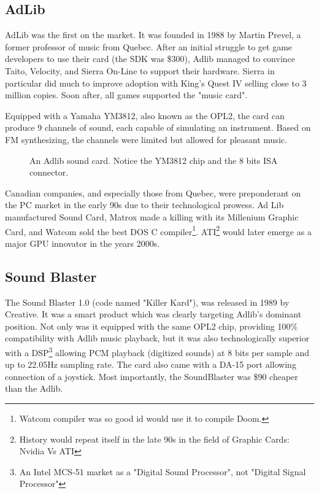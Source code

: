 \documentclass[book.tex]{subfiles}
\begin{document}
  \subsection{AdLib}
  AdLib was the first on the market. It was founded in 1988 by Martin Prevel, a former professor of music from Quebec. After an initial struggle to get game developers to use their card (the SDK was \$300), Adlib managed to convince Taito, Velocity, and Sierra On-Line to support their hardware. Sierra in particular did much to improve adoption with King's Quest IV selling close to 3 million copies. Soon after, all games supported the "music card".\\
  \par
   Equipped with a Yamaha YM3812, also known as the OPL2, the card can produce 9 channels of sound, each capable of simulating an instrument. Based on FM synthesizing, the channels were limited but allowed for pleasant music.\\
  \begin{figure}[H] 
    \centering 
    \caption{An Adlib sound card. Notice the YM3812 chip and the 8 bits ISA connector.}
  \end{figure}
   
\par
{} Canadian companies, and especially those from Quebec, were preponderant on the PC market in the early 90s due to their technological prowess. Ad Lib manufactured Sound Card, Matrox made a killing with its Millenium Graphic Card, and Watcom sold the best DOS C compiler\footnote{Watcom compiler was so good id would use it to compile Doom.}. ATI\footnote{History would repeat itself in the late 90s in the field of Graphic Cards: Nvidia Vs ATI} would later emerge as a major GPU innovator in the years 2000s.\\
  
  


  \subsection{Sound Blaster}
  The Sound Blaster 1.0 (code named "Killer Kard"), was released in 1989 by Creative. It was a smart product which was clearly targeting Adlib's dominant position. Not only was it equipped with the same OPL2 chip, providing 100\% compatibility with Adlib music playback, but it was also technologically superior with a DSP\footnote{An Intel MCS-51 market as a "Digital Sound Processor", not "Digital Signal Processor"}  allowing PCM playback (digitized sounds) at 8 bits per sample and up to 22.05Hz sampling rate. The card also came with a DA-15 port allowing connection of a joystick. Most importantly, the SoundBlaster was \$90 cheaper than the Adlib.\\ 
\par
\end{document}
